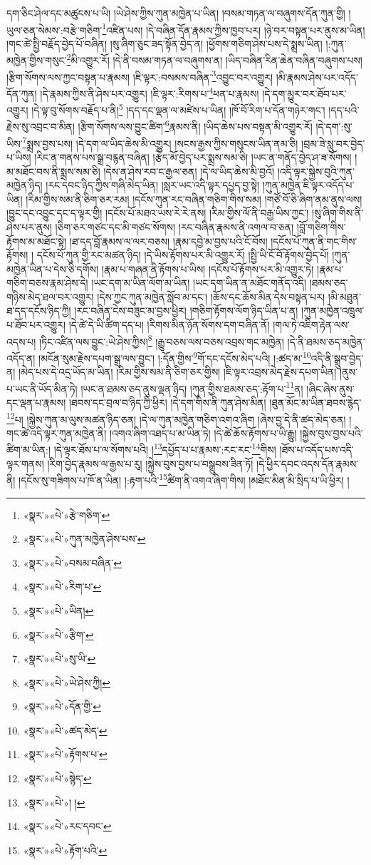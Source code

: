 དག་ཅིང་ཤེལ་དང་མཚུངས་པ་ཡི། །ཡེ་ཤེས་ཀྱིས་ཀུན་མཁྱེན་པ་ཡིན། །བསམ་གཏན་ལ་བཞུགས་དོན་ཀུན་གྱི། །ཡུལ་ཅན་སེམས་:བརྩེ་གཅིག་\footnote{«སྣར་»«པེ་»རྩེ་གཅིག་}འཛིན་པས། །དེ་བཞིན་དོན་རྣམས་ཀྱིས་ཁྱབ་པར། །ཉེ་བར་བསྟན་པར་ནུས་མ་ཡིན། །གང་ཚེ་སྤྱི་བརྗོད་བྱེད་པོ་བཞིན། །སུ་ཞིག་ཅུང་ཟད་སྟོན་བྱེད་ན། །ཕྱོགས་གཅིག་ཤེས་པས་དེ་སྨྲས་ཡིན། །:ཀུན་མཁྱེན་གྱིས་གསུང་\footnote{«སྣར་»«པེ་»ཀུན་མཁྱེན་ཤེས་པས་}མི་འགྱུར་རོ། །དེ་ནི་བསམ་གཏན་ལ་བཞུགས་ན། །ཡིད་བཞིན་རིན་ཆེན་བཞིན་བཞུགས་པས། །རྩིག་སོགས་ལས་ཀྱང་བསྟན་པ་རྣམས། །ཇི་ལྟར་:བསམས་བཞིན་\footnote{«སྣར་»«པེ་»བསམ་བཞིན་}འབྱུང་བར་འགྱུར། །མི་རྣམས་ཤེས་པར་འདོད་དོན་ཀུན། །དེ་རྣམས་ཀྱིས་ནི་ཤེས་པར་འགྱུར། །ཇི་ལྟར་:རིགས་པ་\footnote{«སྣར་»«པེ་»རིག་པ་}ཕན་པ་རྣམས། །དེ་དག་མྱུར་བར་ཐོབ་པར་འགྱུར། །དེ་ལྟ་བུ་སོགས་བརྗོད་པ་ནི།\footnote{«སྣར་»«པེ་»ཡིན།} །དད་དང་ལྡན་ལ་མཛེས་པ་ཡིན། །ཁོ་བོ་རིག་པ་དོན་གཉེར་གང་། །དད་པའི་རྗེས་སུ་འབྲང་བ་མིན། །རྩིག་སོགས་ལས་བྱུང་ཚིག་\footnote{«སྣར་»«པེ་»རྩིག་}རྣམས་ནི། །ཡིད་ཆེས་པས་བསྟན་མི་འགྱུར་རོ། །དེ་དག་:སུ་ཡིས་\footnote{«སྣར་»«པེ་»སུ་ཡི་}སྨྲས་བྱས་པས། །དེ་དག་ལ་ཡིད་ཆེས་མི་འགྱུར། །སངས་རྒྱས་ཀྱིས་གསུངས་ཡིན་ནམ་ཅི། །བྲམ་ཟེ་སླུ་བར་བྱེད་པ་ཡིས། །རིང་ན་གནས་པས་སྒྲ་བརྙན་བཞིན། །རྩེད་མོ་བྱེད་པར་སྨྲས་སམ་ཅི། །ཡང་ན་གནོད་བྱེད་ཤ་ཟ་སོགས། །མ་མཐོང་བས་ནི་སྨྲས་སམ་ཅི། །དེས་ན་ཤེས་རབ་ང་རྒྱལ་ཅན། །དེ་ལ་ཡིད་ཆེས་མི་བྱའོ། །འདི་ལྟར་སྐྱེས་བུའི་ཀུན་མཁྱེན་ཉིད། །རང་དབང་ཉིད་ཀྱིས་གཞི་མེད་ཡིན། །སླར་ཡང་འདི་ལྟར་དཔྱད་བྱ་སྟེ། །ཀུན་མཁྱེན་ཇི་ལྟར་འདོད་པ་ཡིན། །རིམ་གྱིས་སམ་ནི་ཅིག་ཅར་རམ། །དངོས་ཀུན་རང་བཞིན་གཅིག་གིས་སམ། །གཙོ་བོ་ཅི་ཞིག་ནམ་ནུས་ལས། །བྱུང་དང་འབྱུང་དང་ད་ལྟར་གྱི། །དངོས་པོ་མཐའ་ཡས་རེ་རེ་ནས། །རིམ་གྱིས་ལོ་ནི་བརྒྱ་ཡིས་ཀྱང་། །སུ་ཞིག་གིས་ནི་ཤེས་པར་ནུས། །ཅིག་ཅར་གཙང་དང་མི་གཙང་སོགས། །རང་བཞིན་རྣམས་ནི་འགལ་བ་ཅན། །བློ་གཅིག་གིས་རྟོགས་མ་མཐོང་སྟེ། །ཐ་དད་བློ་རྣམས་ལ་ལར་བཅས། །རྣམ་དབྱེ་མ་བྱས་པའི་ངོ་བོས། །དངོས་པོ་ཀུན་ནི་གང་གིས་རྟོགས། །
དངོས་པོ་ཀུན་གྱི་རང་མཚན་ཉིད། །དེ་ཡིས་རྟོགས་པར་མི་འགྱུར་རོ། །སྤྱི་ཡི་ངོ་བོ་རྟོགས་བྱེད་པོ། །ཀུན་མཁྱེན་ཡིན་པ་དེས་ཅི་དགོས། །རྣམ་པ་གཞན་ནི་རྟོགས་པ་ཡིས། །དངོས་པོ་རྟོགས་པར་མི་འགྱུར་ཏེ། །རྣམ་པ་གཅིག་བཅས་རྣམ་ཤེས་དེ། །ཡང་དག་མ་ཡིན་ལོག་མ་ཡིན། །ཡང་དག་ཡིན་ན་མཐོང་གནོད་འདི། །ཐམས་ཅད་གཉིས་མེད་ཐལ་བར་འགྱུར། །དེས་ཀྱང་ཀུན་མཁྱེན་སློབ་མ་དང་། །ཆོས་དང་ཆོས་མིན་དེས་བསྟན་པར། །མི་མཐུན་ཐ་དད་དངོས་ཉིད་ཀྱི། །རང་བཞིན་ངེས་བཟུང་མ་བྱས་ཕྱིར། །གཅིག་རྟོགས་ལོག་ཉིད་ཡིན་པ་ན། །ཀུན་མཁྱེན་འཁྲུལ་པ་ཐོབ་པར་འགྱུར། །དེ་ཚེ་དེ་ཡི་ཚིག་དད་པ། །རིགས་མིན་ཉོན་སོགས་དག་བཞིན་ནོ། །གལ་ཏེ་འཇིག་རྟེན་ལས་འདས་པ། །ཏིང་འཛིན་ལས་བྱུང་:ཡེ་ཤེས་ཀྱིས།\footnote{«སྣར་»«པེ་»ཡེ་ཤེས་ཀྱི།} །རྒྱུ་བཅས་ལས་བཅས་འབྲས་གང་མཁྱེན། །དེ་ནི་ཐམས་ཅད་མཁྱེན་འདོད་ན། །མངོན་སུམ་རྗེས་དཔག་སྒྲ་ལས་བྱུང་། །:དོན་གྱིས་\footnote{«སྣར་»«པེ་»དོན་གྱི་}གོ་དང་དངོས་མེད་པའི། །:ཚད་མ་\footnote{«སྣར་»«པེ་»ཚད་མེད་}འདི་ནི་སྒྲུབ་བྱེད་ན། །མེད་པས་དེ་འདྲ་ཡོད་མ་ཡིན། །རིམ་གྱིས་སམ་ནི་ཅིག་ཅར་གྱིས། །ཇི་ལྟར་འབྲས་མེད་རྗེས་དཔག་ཡིན། །ནུས་པ་ཡང་ནི་ཡོད་མིན་ཏེ། །ཡང་ན་ཐམས་ཅད་ནུས་ལྡན་ཉིད། །ཀུན་གྱིས་ཐམས་ཅད་:རྟོག་པ་\footnote{«སྣར་»«པེ་»རྟོགས་པ་}ན། །ཞིང་ཞེས་ནུས་དང་ལྡན་པ་རྣམས། །ཐབས་དང་བྲལ་བ་ཉིད་ཀྱི་ཕྱིར། །དེ་དག་གིས་ནི་ཀུན་ཤེས་མིན། །ཐུན་མོང་མ་ཡིན་ཐབས་རྙེད་\footnote{«སྣར་»«པེ་»སྙེད་}པ། །སྐྱེས་ཀུན་མ་ལུས་མཚན་ཉིད་ཅན། །དེ་ལ་ཀུན་མཁྱེན་གཅིག་འགའ་ཞིག །ཞེས་བྱ་དེ་ནི་ཚད་མེད་ཅན། །གང་ཚེ་འདི་ལྟར་ཀུན་མཁྱེན་ནི། །འགའ་ཞིག་འཐད་པ་མ་ཡིན་ཏེ། །དེ་ཚེ་ཆོས་རྟོགས་པ་ཡི་རྒྱུ། །སྐྱེས་བུས་བྱས་པའི་ཚིག་མ་ཡིན:། །དེ་ལྟར་ཐོས་པ་ལ་སོགས་པའི། །\footnote{«སྣར་»«པེ་»། །}དཔྱོད་པ་པ་རྣམས་:རང་རང་\footnote{«སྣར་»«པེ་»རང་དབང་}གིས། །ཐོས་པ་འདོད་པས་འདི་ལྟར་གནས། །རིག་བྱེད་རྣམས་ལ་རྒྱས་པ་རུ། །སྐྱེས་བུས་བྱས་པ་བསྒྲུབས་ཟིན་ཏོ། །དེ་ཕྱིར་དབང་འདས་དོན་རྣམས་ནི། །དངོས་སུ་གཟིགས་པ་ཁོ་ན་ཡིན། །:རྟག་པའི་\footnote{«སྣར་»«པེ་»རྟོག་པའི་}ཚིག་ནི་འགའ་ཞིག་གིས། །མཐོང་མིན་མི་སྲིད་པ་ཡི་ཕྱིར། །
